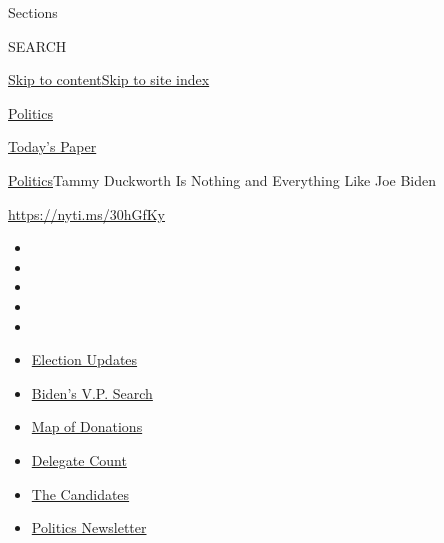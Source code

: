 Sections

SEARCH

\protect\hyperlink{site-content}{Skip to
content}\protect\hyperlink{site-index}{Skip to site index}

\href{https://www.nytimes3xbfgragh.onion/section/politics}{Politics}

\href{https://myaccount.nytimes3xbfgragh.onion/auth/login?response_type=cookie\&client_id=vi}{}

\href{https://www.nytimes3xbfgragh.onion/section/todayspaper}{Today's
Paper}

\href{/section/politics}{Politics}\textbar{}Tammy Duckworth Is Nothing
and Everything Like Joe Biden

\url{https://nyti.ms/30hGfKy}

\begin{itemize}
\item
\item
\item
\item
\item
\end{itemize}

\begin{itemize}
\item
  \href{https://www.nytimes3xbfgragh.onion/2020/07/31/us/elections/biden-vs-trump.html?action=click\&pgtype=Article\&state=default\&region=TOP_BANNER\&context=storylines_menu}{Election
  Updates}
\item
  \href{https://www.nytimes3xbfgragh.onion/article/biden-vice-president-2020.html?action=click\&pgtype=Article\&state=default\&region=TOP_BANNER\&context=storylines_menu}{Biden's
  V.P. Search}
\item
  \href{https://www.nytimes3xbfgragh.onion/interactive/2020/07/24/us/politics/trump-biden-campaign-donors.html?action=click\&pgtype=Article\&state=default\&region=TOP_BANNER\&context=storylines_menu}{Map
  of Donations}
\item
  \href{https://www.nytimes3xbfgragh.onion/interactive/2020/us/elections/delegate-count-primary-results.html?action=click\&pgtype=Article\&state=default\&region=TOP_BANNER\&context=storylines_menu}{Delegate
  Count}
\item
  \href{https://www.nytimes3xbfgragh.onion/interactive/2019/us/politics/2020-presidential-candidates.html?action=click\&pgtype=Article\&state=default\&region=TOP_BANNER\&context=storylines_menu}{The
  Candidates}
\item
  \href{https://www.nytimes3xbfgragh.onion/newsletters/politics?action=click\&pgtype=Article\&state=default\&region=TOP_BANNER\&context=storylines_menu}{Politics
  Newsletter}
\end{itemize}

